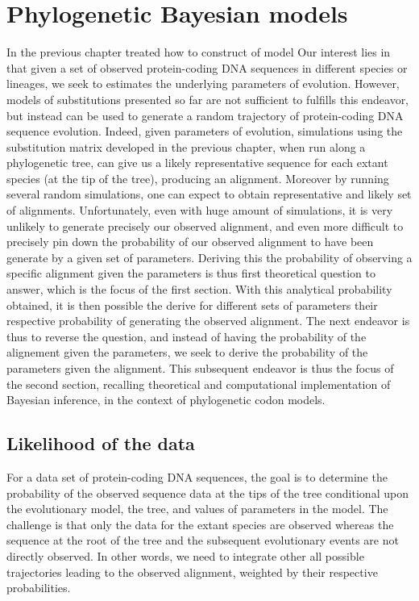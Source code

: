 \chapter{Phylogenetic Bayesian models}
{
	\hypersetup{linkcolor=GREYDARK}
	\minitoc
}
\label{sec:phylo_bayes}
In the previous chapter treated how to construct of model 
Our interest lies in that given a set of observed protein-coding DNA sequences in different species or lineages, we seek to estimates the underlying parameters of evolution.
However, models of substitutions presented so far are not sufficient to fulfills this endeavor, but instead can be used to generate a random trajectory of protein-coding DNA sequence evolution.
Indeed, given parameters of evolution, simulations using the substitution matrix developed in the previous chapter, when run along a phylogenetic tree, can give us a likely representative sequence for each extant species (at the tip of the tree), producing an alignment. 
Moreover by running several random simulations, one can expect to obtain representative and likely set of alignments.
Unfortunately, even with huge amount of simulations, it is very unlikely to generate precisely our observed alignment, and even more difficult to precisely pin down the probability of our observed alignment to have been generate by a given set of parameters.
Deriving this the probability of observing a specific alignment given the parameters is thus first theoretical question to answer, which is the focus of the first section.
With this analytical probability obtained, it is then possible the derive for different sets of parameters their respective probability of generating the observed alignment.
The next endeavor is thus to reverse the question, and instead of having the probability of the alignement given the parameters, we seek to derive the probability of the parameters given the alignment.
This subsequent endeavor is thus the focus of the second section, recalling theoretical and computational implementation of Bayesian inference, in the context of phylogenetic codon models.

\section{Likelihood of the data}

For a data set of protein-coding \acrshort{DNA} sequences, the goal is to determine the probability of the observed sequence data at the tips of the tree conditional upon the evolutionary model, the tree, and values of parameters in the model.
The challenge is that only the data for the extant species are observed whereas the sequence at the root of the tree and the subsequent evolutionary events are not directly observed.
In other words, we need to integrate other all possible trajectories leading to the observed alignment, weighted by their respective probabilities.

